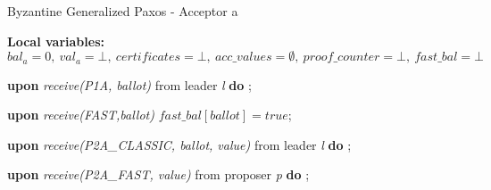 \begin{algorithm}
\begin{algorithmic}[1]
		\iffalse \State
		\Function{proved\_safe}{Q, m}
		\State $k = max(i\ |\ (i < m) \wedge (\exists a \in Q :\ val_a[i]\ \neq null))$;
		\State $RS = \{R \in k$-$quorum\ |\ \forall a \in R \cap Q : val_a[k] \neq null\}$;
		\State $\gamma(R) = \sqcap \{v_a[k]\ |\ a \in Q \cap R \}$;
		\State $\Gamma = \{\gamma(R)\ |\ R \in RS \}$;
		\State
		\If{$RS = \varnothing$}
		\State \textbf{return} $\{val_a[k]\ |\ (a \in Q) \wedge (val_a[k] \neq null)\}$;
		\Else
		\State \textbf{return} $\sqcup \Gamma$;
		\EndIf
		\EndFunction
		\fi
		
	\end{algorithmic}
\end{algorithm}

\begin{algorithm} 
	\caption{Byzantine Generalized Paxos - Acceptor a}
	\label{BFT-Acc}
	\textbf{Local variables:} $bal_a = 0,\ val_a = \bot,\ certificates = \bot,\ acc\_values = \emptyset,\ proof\_counter = \bot,\ fast\_bal = \bot$ 
	\begin{algorithmic}[1]
		\State
		\State \textbf{upon} \textit{receive(P1A, ballot)} from leader \textit{l} \textbf{do}
		\State \hspace{\algorithmicindent} ;
		
		\State
		\State \textbf{upon} \textit{receive(FAST,ballot)}
		\State \hspace{\algorithmicindent} $fast\_bal[ballot] = true$;
		
		\State
		\State \textbf{upon} \textit{receive(P2A\_CLASSIC, ballot, value)} from leader \textit{l} \textbf{do}
		\State \hspace{\algorithmicindent} ; 

		\State		
		\State \textbf{upon} \textit{receive(P2A\_FAST, value)} from proposer \textit{p} \textbf{do}
		\State \hspace{\algorithmicindent} ;
		

\end{algorithmic}
\end{algorithm}

